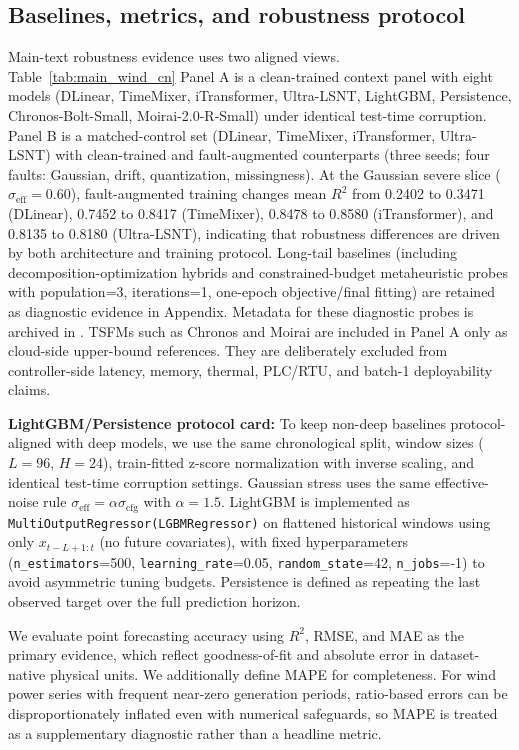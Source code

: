 \documentclass[review,1p,times]{elsarticle}
\begin{document}
\subsection{Baselines, metrics, and robustness protocol}
\label{sec:robust_protocol}

Main-text robustness evidence uses two aligned views. Table~\ref{tab:main_wind_cn} Panel A is a clean-trained context panel with eight models (DLinear, TimeMixer, iTransformer, Ultra-LSNT, LightGBM, Persistence, Chronos-Bolt-Small, Moirai-2.0-R-Small) under identical test-time corruption. Panel B is a matched-control set (DLinear, TimeMixer, iTransformer, Ultra-LSNT) with clean-trained and fault-augmented counterparts (three seeds; four faults: Gaussian, drift, quantization, missingness). At the Gaussian severe slice ($\sigma_{\mathrm{eff}}=0.60$), fault-augmented training changes mean $R^2$ from 0.2402 to 0.3471 (DLinear), 0.7452 to 0.8417 (TimeMixer), 0.8478 to 0.8580 (iTransformer), and 0.8135 to 0.8180 (Ultra-LSNT), indicating that robustness differences are driven by both architecture and training protocol.
Long-tail baselines (including decomposition-optimization hybrids and constrained-budget metaheuristic probes with population=3, iterations=1, one-epoch objective/final fitting) are retained as diagnostic evidence in Appendix. Metadata for these diagnostic probes is archived in .
TSFMs such as Chronos and Moirai are included in Panel A only as cloud-side upper-bound references. They are deliberately excluded from controller-side latency, memory, thermal, PLC/RTU, and batch-1 deployability claims.

\noindent\textbf{LightGBM/Persistence protocol card:} To keep non-deep baselines protocol-aligned with deep models, we use the same chronological split, window sizes ($L=96$, $H=24$), train-fitted z-score normalization with inverse scaling, and identical test-time corruption settings. Gaussian stress uses the same effective-noise rule $\sigma_{\mathrm{eff}}=\alpha\sigma_{\mathrm{cfg}}$ with $\alpha=1.5$. LightGBM is implemented as \texttt{MultiOutputRegressor(LGBMRegressor)} on flattened historical windows using only $x_{t-L+1:t}$ (no future covariates), with fixed hyperparameters (\texttt{n\_estimators}=500, \texttt{learning\_rate}=0.05, \texttt{random\_state}=42, \texttt{n\_jobs}=-1) to avoid asymmetric tuning budgets. Persistence is defined as repeating the last observed target over the full prediction horizon.

We evaluate point forecasting accuracy using $R^2$, RMSE, and MAE as the primary evidence, which reflect goodness-of-fit and absolute error in dataset-native physical units.
We additionally define MAPE for completeness. For wind power series with frequent near-zero generation periods, ratio-based errors can be disproportionately inflated even with numerical safeguards, so MAPE is treated as a supplementary diagnostic rather than a headline metric.
\end{document}
